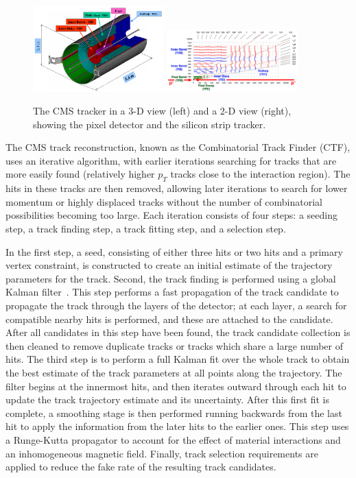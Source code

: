 \documentclass[preprint,sort&compress]{elsarticle}
\begin{document}
\begin{figure}[!Hhtb]
\begin{center}
    \includegraphics[width=0.45\textwidth]{CMSTrackerLayout.pdf}
    \includegraphics[width=0.45\textwidth]{CMS2Dtracker.png}
    \caption{The CMS tracker in a 3-D view (left) and a 2-D view (right), showing the pixel detector and the silicon
    strip tracker. \label{fig:tracker}}
    \end{center}
\end{figure}

The CMS track reconstruction, known as the Combinatorial Track Finder (CTF), uses an iterative algorithm, with
earlier iterations searching for tracks that are more easily found (relatively higher $p_T$ tracks close to
the interaction region). The hits in these tracks are then removed, allowing later iterations to search for
lower momentum or highly displaced tracks without the number of combinatorial possibilities becoming too
large. Each iteration consists of four steps: a seeding step, a track finding step, a track fitting step, and
a selection step.

In the first step, a seed, consisting of either three hits or two hits and a primary vertex constraint, is
constructed to create an initial estimate of the trajectory parameters for the track. Second, the track
finding is performed using a global Kalman filter~\cite{bib:Fruhwirth:1987fm}. This step performs a fast
propagation of the track candidate to propagate the track through the layers of the detector; at each layer, a
search for compatible nearby hits is performed, and these are attached to the candidate. After all candidates
in this step have been found, the track candidate collection is then cleaned to remove duplicate tracks or
tracks which share a large number of hits. The third step is to perform a full Kalman fit over the whole
track to obtain the best estimate of the track parameters at all points along the trajectory. The filter
begins at the innermost hits, and then iterates outward through each hit to update the track trajectory
estimate and its uncertainty. After this first fit is complete, a smoothing stage is then performed running
backwards from the last hit to apply the information from the later hits to the earlier ones. This step uses a
Runge-Kutta propagator to account for the effect of material interactions and an inhomogeneous magnetic
field. Finally, track selection requirements are applied to reduce the fake rate of the resulting track
candidates.
\end{document}
